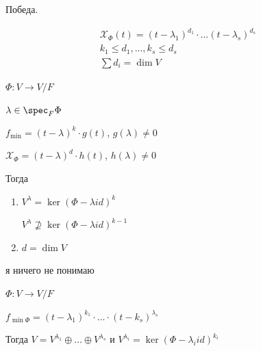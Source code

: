 Победа.

\begin{coroll}{}{}
    \begin{gather*}
        \mathcal{X}_{\Phi} (t) = (t - \lambda_1)^{d_1} \cdot \ldots (t - \lambda_s)^{d_s}
        \\
        k_1 \leq d_1, \ldots, k_s \leq d_s
        \\
        \sum d_i = \dim V
    \end{gather*}
\end{coroll}

\begin{thrm}{}{}
    \( \Phi : V \to V / F \)

    \( \lambda \in \spec_F \Phi \)

    \( f_{\min} = (t - \lambda)^k \cdot g(t) \), \( g(\lambda) \neq 0 \)

    \( \mathcal{X}_{\Phi} = (t - \lambda)^d \cdot h(t) \), \( h(\lambda) \neq 0 \)

    Тогда
    \begin{enumerate}
        \item
            \( V^{\lambda} = \ker (\Phi - \lambda id)^k \)

            \( V^{\lambda} \not\supseteq \ker (\Phi - \lambda id)^{k - 1} \)
        \item
            \( d = \dim V \)
    \end{enumerate}
\end{thrm}

я ничего не понимаю

\begin{lemma}{}{}
    \( \Phi : V \to V / F \)

    \( f_{\min \Phi} = (t - \lambda_1)^{k_1} \cdot \ldots \cdot (t - k_s)^{\lambda_s} \)

    Тогда \( V = V^{\lambda_1} \oplus \ldots \oplus V^{\lambda_s} \) и \( V^{\lambda_i} = \ker (\Phi - \lambda_i id)^{k_i} \)
\end{lemma}

